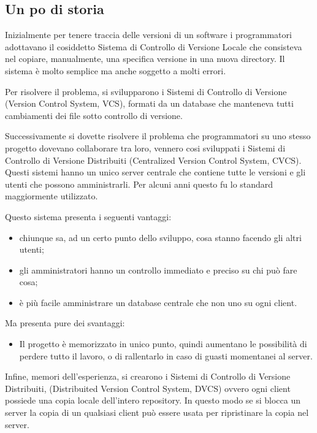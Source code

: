 \subsection{Un po di storia}

Inizialmente per tenere traccia delle versioni di un software i programmatori adottavano il cosiddetto Sistema di Controllo di Versione Locale che consisteva nel copiare, manualmente, una specifica versione in una nuova directory. Il sistema è molto semplice ma anche soggetto a molti errori. 

Per risolvere il problema, si svilupparono i Sistemi di Controllo di Versione (Version Control System, VCS), formati da un database che manteneva tutti cambiamenti dei file sotto controllo di versione.

Successivamente si dovette risolvere il problema che programmatori su uno stesso progetto dovevano collaborare tra loro, vennero cosi sviluppati i Sistemi di Controllo di Versione Distribuiti (Centralized Version Control System, CVCS). Questi sistemi hanno un unico server centrale che contiene tutte le versioni e gli utenti che possono amministrarli. Per alcuni anni questo fu lo standard maggiormente utilizzato.

Questo sistema presenta i seguenti vantaggi:

\begin{itemize}
\item chiunque sa, ad un certo punto dello sviluppo, cosa stanno facendo gli altri utenti;
\item gli amministratori hanno un controllo immediato e preciso su chi può fare cosa;
\item è più facile amministrare un database centrale che non uno su ogni client.
\end{itemize}

Ma presenta pure dei svantaggi:

\begin{itemize}
\item Il progetto è memorizzato in unico punto, quindi aumentano le possibilità di perdere tutto il lavoro, o di rallentarlo in caso di guasti momentanei al server.
\end{itemize}

Infine, memori dell'esperienza, si crearono i Sistemi di Controllo di Versione Distribuiti, (Distribuited Version Control System, DVCS) ovvero ogni client possiede una copia locale dell'intero repository. In questo modo se si blocca un server la copia di un qualsiasi client può essere usata per ripristinare la copia nel server.

